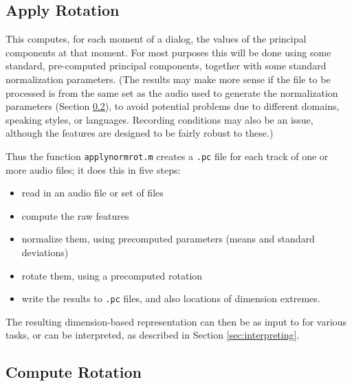 \documentclass[11pt]{article}
\begin{document}
\subsection{Apply Rotation}    \label{applynormrot}
 
This computes, for each moment of a dialog, the values of the
principal components at that moment.  For most purposes this will be
done using some standard, pre-computed principal components, together
with some standard normalization parameters.  (The results may make
more sense if the file to be processed is from the same set as the
audio used to generate the normalization parameters (Section
\ref{computerotation}), to avoid potential problems due to
different domains, speaking styles, or languages.  Recording
conditions may also be an issue, although the features are designed to
be fairly robust to these.)

Thus the function {\tt applynormrot.m} creates a {\tt .pc} file for
each track of one or more audio files; it does this in five steps:
\begin{itemize}   \setlength{\itemsep}{0pt}\setlength{\parskip}{0pt}
\item read in an audio file or set of files
\item compute the raw  features
\item normalize them, using  precomputed parameters (means and
  standard deviations)
\item  rotate them, using a precomputed rotation
\item write the results to {\tt .pc} files, and also locations of dimension
  extremes.
\end{itemize}

The resulting dimension-based representation can then be as input to
for various tasks, or can be interpreted, as described in Section
\ref{sec:interpreting}.


\subsection{Compute Rotation} \label{computerotation}
\end{document}
